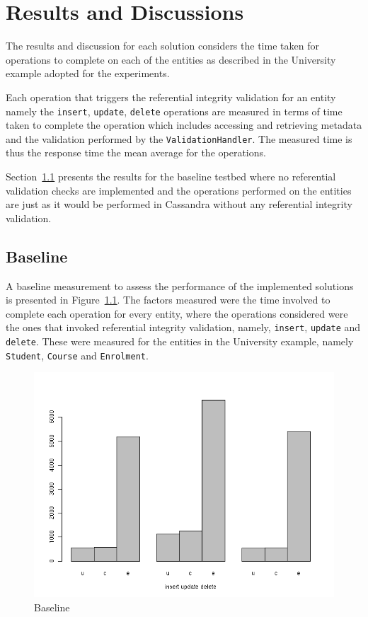 \chapter{Results and Discussions}
The results and discussion for each solution considers the time taken for
operations to complete on each of the entities  as described in the University
example adopted for the experiments.

Each operation that triggers the referential integrity validation for an entity
namely the \texttt{insert}, \texttt{update}, \texttt{delete} operations are
measured in terms of time taken to complete the operation which includes
accessing and retrieving metadata  and the validation performed by the
\texttt{ValidationHandler}. The measured time is thus the response time the mean
average for the operations.

Section~\ref{sr:baseline} presents the results for the baseline testbed where no
referential validation checks are implemented and the operations performed on
the entities are just as it would be performed in Cassandra without any
referential integrity validation.


\section{Baseline}\label{sr:baseline}
A baseline measurement to assess the performance of the implemented solutions is
presented in Figure~\ref{fr:Solution0-barplot}.
The factors measured were the time involved to complete each operation for every
entity, where the operations considered were the ones that invoked referential
integrity validation, namely, \texttt{insert}, \texttt{update} and
\texttt{delete}. These were measured for the entities in the University example,
namely \texttt{Student}, \texttt{Course} and \texttt{Enrolment}.
	
\begin{figure}[h] \centering
\includegraphics[width=.8\textwidth]{./figure/result/Solution0-barplot.png}
		\caption{Baseline}\label{fr:Solution0-barplot}
	\end{figure}
	
